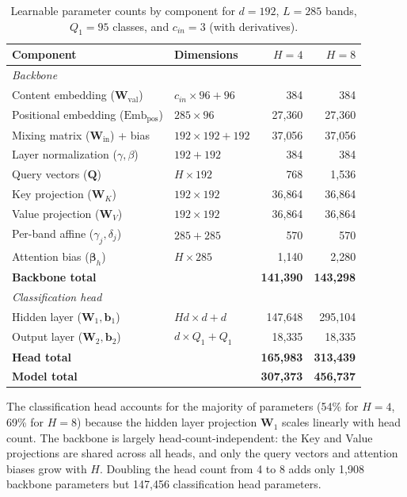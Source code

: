 \documentclass[11pt]{report}
\begin{document}
\begin{table}[ht]
\centering
\caption{Learnable parameter counts by component for $d = 192$, $L = 285$ bands, $Q_1 = 95$ classes, and $c_{in} = 3$ (with derivatives).}
\label{tab:params}
\begin{tabular}{l l r r}
\hline
\textbf{Component} & \textbf{Dimensions} & \textbf{$H=4$} & \textbf{$H=8$} \\
\hline
\multicolumn{4}{l}{\emph{Backbone}} \\
\quad Content embedding ($\mathbf{W}_{\text{val}}$) & $c_{in} \times 96 + 96$ & 384 & 384 \\
\quad Positional embedding ($\text{Emb}_{\text{pos}}$) & $285 \times 96$ & 27{,}360 & 27{,}360 \\
\quad Mixing matrix ($\mathbf{W}_{\text{in}}$) + bias & $192 \times 192 + 192$ & 37{,}056 & 37{,}056 \\
\quad Layer normalization ($\gamma, \beta$) & $192 + 192$ & 384 & 384 \\
\quad Query vectors ($\mathbf{Q}$) & $H \times 192$ & 768 & 1{,}536 \\
\quad Key projection ($\mathbf{W}_K$) & $192 \times 192$ & 36{,}864 & 36{,}864 \\
\quad Value projection ($\mathbf{W}_V$) & $192 \times 192$ & 36{,}864 & 36{,}864 \\
\quad Per-band affine ($\gamma_j, \delta_j$) & $285 + 285$ & 570 & 570 \\
\quad Attention bias ($\bm{\beta}_h$) & $H \times 285$ & 1{,}140 & 2{,}280 \\
\quad \textbf{Backbone total} & & \textbf{141{,}390} & \textbf{143{,}298} \\
\hline
\multicolumn{4}{l}{\emph{Classification head}} \\
\quad Hidden layer ($\mathbf{W}_1, \mathbf{b}_1$) & $Hd \times d + d$ & 147{,}648 & 295{,}104 \\
\quad Output layer ($\mathbf{W}_2, \mathbf{b}_2$) & $d \times Q_1 + Q_1$ & 18{,}335 & 18{,}335 \\
\quad \textbf{Head total} & & \textbf{165{,}983} & \textbf{313{,}439} \\
\hline
\textbf{Model total} & & \textbf{307{,}373} & \textbf{456{,}737} \\
\hline
\end{tabular}
\end{table}

The classification head accounts for the majority of parameters (54\% for $H=4$, 69\% for $H=8$) because the hidden layer projection $\mathbf{W}_1$ scales linearly with head count. The backbone is largely head-count-independent: the Key and Value projections are shared across all heads, and only the query vectors and attention biases grow with $H$. Doubling the head count from 4 to 8 adds only 1{,}908 backbone parameters but 147{,}456 classification head parameters.
\end{document}
